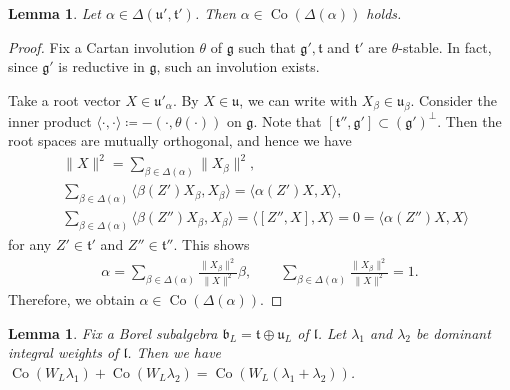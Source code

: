 \documentclass[10pt,a4paper]{amsart}
\numberwithin{equation}{section}
\newtheorem{Lemma}[Theorem]{Lemma}
\theoremstyle{definition}
\newcommand{\lie}[1]{\mathfrak{#1}}
\DeclareMathOperator{\Co}{\mathrm{Co}}
\begin{document}
\begin{Lemma}\label{lem:ConvexityRestriction}
	Let $\alpha \in \Delta(\lie{u'}, \lie{t'})$.
	Then $\alpha \in \Co(\Delta(\alpha))$ holds.
\end{Lemma}

\begin{proof}
	Fix a Cartan involution $\theta$ of $\lie{g}$ such that
	$\lie{g}', \lie{t}$ and $\lie{t}'$ are $\theta$-stable.
	In fact, since $\lie{g}'$ is reductive in $\lie{g}$, such an involution exists.

	Take a root vector $X \in \lie{u}'_{\alpha}$.
	By $X \in \lie{u}$, we can write  with $X_{\beta} \in \lie{u}_{\beta}$.
	Consider the inner product $\langle \cdot, \cdot \rangle \coloneq -(\cdot, \theta(\cdot))$ on $\lie{g}$.
	Note that $[\lie{t''}, \lie{g'}] \subset (\lie{g}')^\perp$.
	Then the root spaces are mutually orthogonal, and hence we have
	\begin{align*}
		&\|X\|^2= \sum_{\beta \in \Delta(\alpha)} \|X_\beta\|^2, \\
		&\sum_{\beta \in \Delta(\alpha)} \langle \beta(Z')X_\beta, X_\beta\rangle= \langle \alpha(Z')X, X\rangle, \\
		&\sum_{\beta \in \Delta(\alpha)} \langle \beta(Z'')X_\beta, X_\beta\rangle= \langle [Z'', X], X\rangle = 0 = \langle \alpha(Z'')X, X\rangle
	\end{align*}
	for any $Z' \in \lie{t'}$ and $Z'' \in \lie{t''}$.
	This shows
	\begin{align*}
		\alpha = \sum_{\beta \in \Delta(\alpha)} \frac{\|X_\beta\|^2}{\|X\|^2} \beta, \qquad \sum_{\beta \in \Delta(\alpha)} \frac{\|X_\beta\|^2}{\|X\|^2} = 1.
	\end{align*}
	Therefore, we obtain $\alpha \in \Co(\Delta(\alpha))$.
\end{proof}


\begin{Lemma}\label{lem:SumConvex}
	Fix a Borel subalgebra $\lie{b}_L = \lie{t}\oplus \lie{u}_L$ of $\lie{l}$.
	Let $\lambda_1$ and $\lambda_2$ be dominant integral weights of $\lie{l}$.
	Then we have $\Co(W_{L}\lambda_1)+\Co(W_{L}\lambda_2) = \Co(W_{L}(\lambda_1+\lambda_2))$.
\end{Lemma}
	
\end{document}

